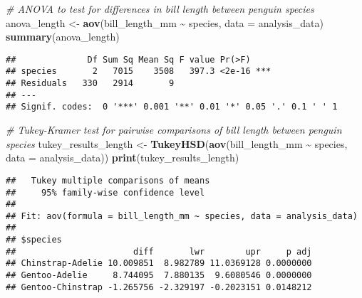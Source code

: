\documentclass[
]{article}
\newenvironment{Shaded}{\begin{snugshade}}{\end{snugshade}}
\newcommand{\AttributeTok}[1]{\textcolor[rgb]{0.13,0.29,0.53}{#1}}
\newcommand{\CommentTok}[1]{\textcolor[rgb]{0.56,0.35,0.01}{\textit{#1}}}
\newcommand{\FunctionTok}[1]{\textcolor[rgb]{0.13,0.29,0.53}{\textbf{#1}}}
\newcommand{\NormalTok}[1]{#1}
\newcommand{\OtherTok}[1]{\textcolor[rgb]{0.56,0.35,0.01}{#1}}
\newcommand{\SpecialCharTok}[1]{\textcolor[rgb]{0.81,0.36,0.00}{\textbf{#1}}}
\begin{document}
\begin{Shaded}
\begin{Highlighting}[]
\CommentTok{\# ANOVA to test for differences in bill length between penguin species}
\NormalTok{anova\_length }\OtherTok{\textless{}{-}} \FunctionTok{aov}\NormalTok{(bill\_length\_mm }\SpecialCharTok{\textasciitilde{}}\NormalTok{ species, }\AttributeTok{data =}\NormalTok{ analysis\_data)}
\FunctionTok{summary}\NormalTok{(anova\_length)}
\end{Highlighting}
\end{Shaded}

\begin{verbatim}
##              Df Sum Sq Mean Sq F value Pr(>F)    
## species       2   7015    3508   397.3 <2e-16 ***
## Residuals   330   2914       9                   
## ---
## Signif. codes:  0 '***' 0.001 '**' 0.01 '*' 0.05 '.' 0.1 ' ' 1
\end{verbatim}

\begin{Shaded}
\begin{Highlighting}[]
\CommentTok{\# Tukey{-}Kramer test for pairwise comparisons of bill length between penguin species}
\NormalTok{tukey\_results\_length }\OtherTok{\textless{}{-}} \FunctionTok{TukeyHSD}\NormalTok{(}\FunctionTok{aov}\NormalTok{(bill\_length\_mm }\SpecialCharTok{\textasciitilde{}}\NormalTok{ species, }\AttributeTok{data =}\NormalTok{ analysis\_data))}
\FunctionTok{print}\NormalTok{(tukey\_results\_length)}
\end{Highlighting}
\end{Shaded}

\begin{verbatim}
##   Tukey multiple comparisons of means
##     95% family-wise confidence level
## 
## Fit: aov(formula = bill_length_mm ~ species, data = analysis_data)
## 
## $species
##                       diff       lwr        upr     p adj
## Chinstrap-Adelie 10.009851  8.982789 11.0369128 0.0000000
## Gentoo-Adelie     8.744095  7.880135  9.6080546 0.0000000
## Gentoo-Chinstrap -1.265756 -2.329197 -0.2023151 0.0148212
\end{verbatim}
\end{document}
